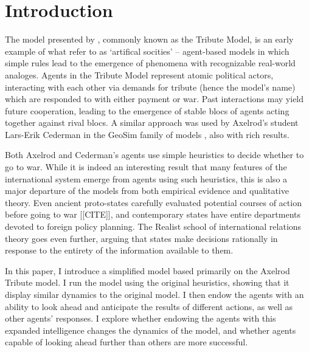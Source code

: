 \documentclass{article}
\begin{document}
\title{}
	\author{}
	\maketitle{}

\begin{abstract}
\end{abstract}

\section{Introduction}
The model presented by \citet{axelrod_1995}, commonly known as the Tribute Model, is an early example of what \citet{epstein_1996} refer to as `artifical socities' -- agent-based models in which simple rules lead to the emergence of phenomena with recognizable real-world analoges. Agents in the Tribute Model represent atomic political actors, interacting with each other via demands for tribute (hence the model's name) which are responded to with either payment or war. Past interactions may yield future cooperation, leading to the emergence of stable blocs of agents acting together against rival blocs. A similar approach was used by Axelrod's student Lars-Erik Cederman in the GeoSim family of models \cite{cederman_1997}, also with rich results.

Both Axelrod and Cederman's agents use simple heuristics to decide whether to go to war. While it is indeed an interesting result that many features of the international system emerge from agents using such heuristics, this is also a major departure of the models from both empirical evidence and qualitative theory. Even ancient proto-states carefully evaluated potential courses of action before going to war [[CITE]], and contemporary states have entire departments devoted to foreign policy planning. The Realist school of international relations theory goes even further, arguing that states make decisions rationally in response to the entirety of the information available to them. 

In this paper, I introduce a simplified model based primarily on the Axelrod Tribute model. I run the model using the original heuristics, showing that it display similar dynamics to the original model. I then endow the agents with an ability to look ahead and anticipate the results of different actions, as well as other agents' responses. I explore whether endowing the agents with this expanded intelligence changes the dynamics of the model, and whether agents capable of looking ahead further than others are more successful. 
\end{document}
